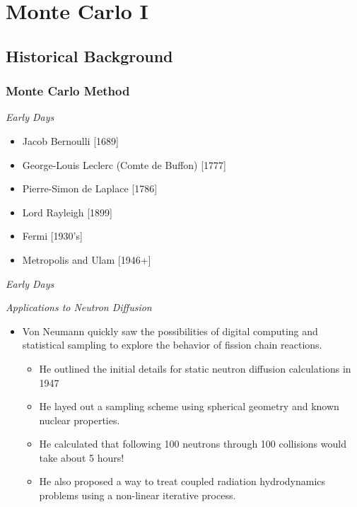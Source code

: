 \chapter{Monte Carlo I}

\section{Historical Background}

\subsection{Monte Carlo Method}


\emph{Early Days}

  \begin{itemize}
  \item Jacob Bernoulli [1689]
  \item George-Louis Leclerc (Comte de Buffon) [1777]
  \item Pierre-Simon de Laplace [1786]
  \item Lord Rayleigh [1899]
  \item Fermi [1930's]
  \item Metropolis and Ulam [1946+]
  \end{itemize}



\emph{Early Days}

  \begin{figure}[htbp]
    \centering
  \end{figure}



\emph{Applications to Neutron Diffusion}
 \begin{itemize}
  \item Von Neumann quickly saw the possibilities of digital computing and statistical sampling to explore the behavior of fission chain reactions.
  \begin{itemize}
   \item He outlined the initial details for static neutron diffusion calculations in 1947
   \item He layed out a sampling scheme using spherical geometry and known nuclear properties.
   \item He calculated that following 100 neutrons through 100 collisions would take about 5 hours!
   \item He also proposed a way to treat coupled radiation hydrodynamics problems using a non-linear iterative process.
  \end{itemize}
 \end{itemize}


